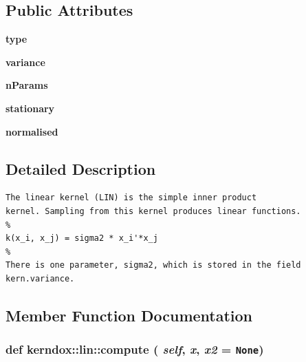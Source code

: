 \subsection*{Public Attributes}
\begin{CompactItemize}
\item 
\hypertarget{classkerndox_1_1lin_faaa9348303b8e71f462208b3de7000d}{
\textbf{type}}
\label{classkerndox_1_1lin_faaa9348303b8e71f462208b3de7000d}

\item 
\hypertarget{classkerndox_1_1lin_fcc4b138431f89cf9e32b12a4b37d0d3}{
\textbf{variance}}
\label{classkerndox_1_1lin_fcc4b138431f89cf9e32b12a4b37d0d3}

\item 
\hypertarget{classkerndox_1_1lin_50d3156549623f32b9ad60415304d3fc}{
\textbf{nParams}}
\label{classkerndox_1_1lin_50d3156549623f32b9ad60415304d3fc}

\item 
\hypertarget{classkerndox_1_1lin_04ec4ee0be6f50a9c371914a4abf1ffc}{
\textbf{stationary}}
\label{classkerndox_1_1lin_04ec4ee0be6f50a9c371914a4abf1ffc}

\item 
\hypertarget{classkerndox_1_1lin_6c60d32e29f376e3033e1728157da5fe}{
\textbf{normalised}}
\label{classkerndox_1_1lin_6c60d32e29f376e3033e1728157da5fe}

\end{CompactItemize}


\subsection{Detailed Description}


\footnotesize\begin{verbatim}The linear kernel (LIN) is the simple inner product
kernel. Sampling from this kernel produces linear functions.
%
k(x_i, x_j) = sigma2 * x_i'*x_j
%
There is one parameter, sigma2, which is stored in the field
kern.variance.

\end{verbatim}
\normalsize
 

\subsection{Member Function Documentation}
\hypertarget{classkerndox_1_1lin_a44fb05c87a84233e7a8592b936debb1}{
\subsubsection[{compute}]{\setlength{\rightskip}{0pt plus 5cm}def kerndox::lin::compute ( {\em self}, \/   {\em x}, \/   {\em x2} = {\tt None})}}
\label{classkerndox_1_1lin_a44fb05c87a84233e7a8592b936debb1}




